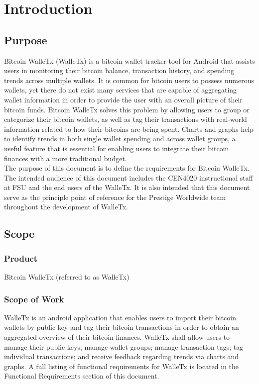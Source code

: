 \section{Introduction}

	\subsection{Purpose}
	
	Bitcoin WalleTx (WalleTx) is a bitcoin wallet tracker tool for Android that assists users in monitoring their bitcoin balance, transaction history, and spending trends across multiple wallets. It is common for bitcoin users to possess numerous wallets, yet there do not exist many services that are capable of aggregating wallet information in order to provide the user with an overall picture of their bitcoin funds. Bitcoin WalleTx solves this problem by allowing users to group or categorize their bitcoin wallets, as well as tag their transactions with real-world information related to how their bitcoins are being spent. Charts and graphs help to identify trends in both single wallet spending and across wallet groups, a useful feature that is essential for enabling users to integrate their bitcoin finances with a more traditional budget.\\

	The purpose of this document is to define the requirements for Bitcoin WalleTx. The intended audience of this document includes the CEN4020 instructional staff at FSU and the end users of the WalleTx. It is also intended that this document serve as the principle point of reference for the Prestige Worldwide team throughout the development of WalleTx.\\

	\subsection{Scope}
	
  \subsubsection{Product}
  Bitcoin WalleTx (referred to as WalleTx)

  \subsubsection{Scope of Work}
  WalleTx is an android application that enables users to import their bitcoin wallets by public key and tag their bitcoin transactions in order to obtain an aggregated overview of their bitcoin finances. WalleTx shall allow users to manage their public keys; manage wallet groups; manage transaction tags; tag individual transactions; and receive feedback regarding trends via charts and graphs. A full listing of functional requirements for WalleTx is located in the Functional Requirements section of this document.
	
